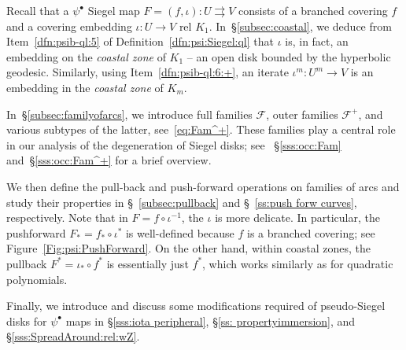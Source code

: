 \documentclass{amsart}
\newcommand{\1}{{\mathbb 1 }}
\newcommand{\hide}[1]{}
\newcommand{\Fam}{{\mathcal F}}
\theoremstyle{remark}
\numberwithin{equation}{section}
\theoremstyle{definition}
\begin{document}
Recall that a $\psi^\bullet$ Siegel map $F=(f,\iota)\colon U\rightrightarrows V$ consists of a branched covering $f$ and a covering embedding $\iota\colon U\to V$ rel $K_1$. In~\S\ref{subsec:coastal}, we deduce from Item~\ref{dfn:psib-ql:5} of Definition~\ref{dfn:psi:Siegel:ql} that $\iota$ is, in fact, an embedding on the {\em coastal zone} of $K_1$ -- an open disk bounded by the hyperbolic geodesic. Similarly, using Item~\ref{dfn:psib-ql:6:+}, an iterate $\iota^m\colon U^m\to V$ is an embedding in the {\em coastal zone} of $K_m$. 

In~\S\ref{subsec:familyofarcs}, we introduce full families $\Fam$, outer families $\Fam^+$, and various subtypes of the latter, see~\eqref{eq:Fam^+}. These families play a central role in our analysis of the degeneration of Siegel disks; see ~\S\ref{sss:occ:Fam} and~\S\ref{sss:occ:Fam^+} for a brief overview.




We then define the pull-back and push-forward operations on families of arcs and study their properties in \S~\ref{subsec:pullback} and \S~\ref{ss:push forw curves}, respectively. Note that in $F=f\circ \iota^{-1}$, the $\iota$ is more delicate. In particular, the pushforward $F_*=f_*\circ \iota^*$ is well-defined because $f$ is a branched covering; see Figure~\ref{Fig:psi:PushForward}. On the other hand, within coastal zones, the pullback $F^*=\iota_* \circ f^*$ is essentially just $f^*$, which works similarly as for quadratic polynomials. 

Finally, we introduce and discuss some modifications required of pseudo-Siegel disks for $\psi^\bullet$ maps in \S\ref{sss:iota peripheral}, \S\ref{ss: propertyimmersion}, and \S\ref{sss:SpreadAround:rel:wZ}.

\hide{\begin{itemize}
\item Recall that a $\psi^\bullet$ Siegel map $F=(f,\iota)\colon U\rightrightarrows V$ consists of a branched covering $f$ and a covering embedding $\iota\colon U\to V$ rel $K_1$. 

    \item In~\S\ref{subsec:pullback}, we show that $\iota$ is in fact an embedding on the coastal zone of $K_1$ -- an open disk bounded by the hyperbolic geodesic. Similarly, an iterate $\iota^m\colon U^m\to V$ is an embdedding in the coastal zone of $K_m$.
    \item In \S~\ref{sss:iota peripheral}, we review the notion of a pseudo-Siegel disk. It is obtained by filling in fjords... All the fillings are naturally done in coastal zones.
\end{itemize}}
\end{document}
